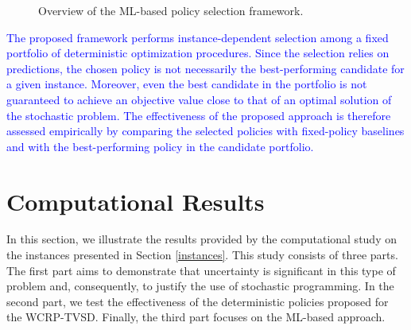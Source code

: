 \documentclass[authoryear,preprint,12pt]{elsarticle}
\newcommand{\rev}[1]{\textcolor{blue}{{#1}}}
\begin{document}
\begin{figure}[h]
{
}%
\caption{Overview of the ML-based policy selection framework.} 
\label{fig:framework}
\end{figure}


\rev{The proposed framework performs instance-dependent selection among a fixed portfolio of deterministic optimization procedures. Since the selection relies on predictions, the chosen policy is not necessarily the best-performing candidate for a given instance. Moreover, even the best candidate in the portfolio is not guaranteed to achieve an objective value close to that of an optimal solution of the stochastic problem. The effectiveness of the proposed approach is therefore assessed empirically by comparing the selected policies with fixed-policy baselines and with the best-performing policy in the candidate portfolio.}


\section{Computational Results}\label{results}
In this section, we illustrate the results provided by the computational study on the instances presented in Section \ref{instances}. This study consists of three parts. The first part aims to demonstrate that uncertainty is significant in this type of problem and, consequently, to justify the use of stochastic programming. In the second part, we test the effectiveness of the deterministic policies proposed for the WCRP-TVSD. Finally, the third part focuses on the ML-based approach.
\end{document}
